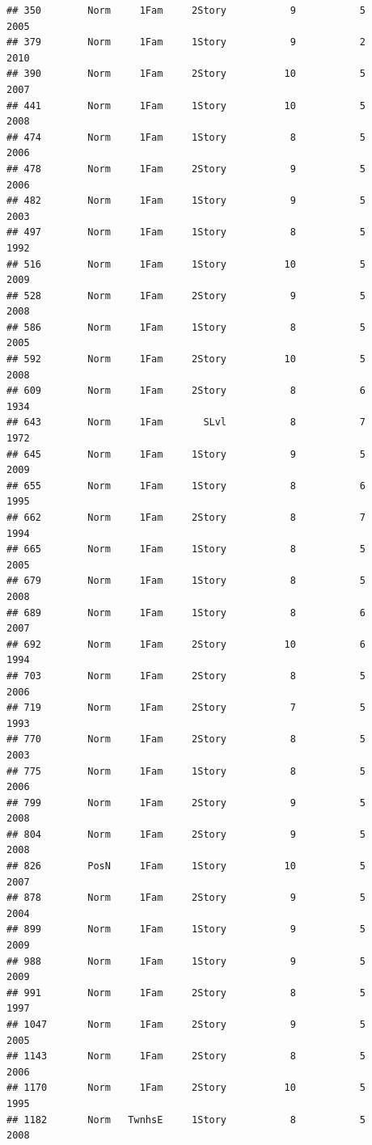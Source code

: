 \documentclass[]{article}
\begin{document}
\begin{verbatim}
## 350        Norm     1Fam     2Story           9           5      2005
## 379        Norm     1Fam     1Story           9           2      2010
## 390        Norm     1Fam     2Story          10           5      2007
## 441        Norm     1Fam     1Story          10           5      2008
## 474        Norm     1Fam     1Story           8           5      2006
## 478        Norm     1Fam     2Story           9           5      2006
## 482        Norm     1Fam     1Story           9           5      2003
## 497        Norm     1Fam     1Story           8           5      1992
## 516        Norm     1Fam     1Story          10           5      2009
## 528        Norm     1Fam     2Story           9           5      2008
## 586        Norm     1Fam     1Story           8           5      2005
## 592        Norm     1Fam     2Story          10           5      2008
## 609        Norm     1Fam     2Story           8           6      1934
## 643        Norm     1Fam       SLvl           8           7      1972
## 645        Norm     1Fam     1Story           9           5      2009
## 655        Norm     1Fam     1Story           8           6      1995
## 662        Norm     1Fam     2Story           8           7      1994
## 665        Norm     1Fam     1Story           8           5      2005
## 679        Norm     1Fam     1Story           8           5      2008
## 689        Norm     1Fam     1Story           8           6      2007
## 692        Norm     1Fam     2Story          10           6      1994
## 703        Norm     1Fam     2Story           8           5      2006
## 719        Norm     1Fam     2Story           7           5      1993
## 770        Norm     1Fam     2Story           8           5      2003
## 775        Norm     1Fam     1Story           8           5      2006
## 799        Norm     1Fam     2Story           9           5      2008
## 804        Norm     1Fam     2Story           9           5      2008
## 826        PosN     1Fam     1Story          10           5      2007
## 878        Norm     1Fam     2Story           9           5      2004
## 899        Norm     1Fam     1Story           9           5      2009
## 988        Norm     1Fam     1Story           9           5      2009
## 991        Norm     1Fam     2Story           8           5      1997
## 1047       Norm     1Fam     2Story           9           5      2005
## 1143       Norm     1Fam     2Story           8           5      2006
## 1170       Norm     1Fam     2Story          10           5      1995
## 1182       Norm   TwnhsE     1Story           8           5      2008

\end{verbatim}
\end{document}
